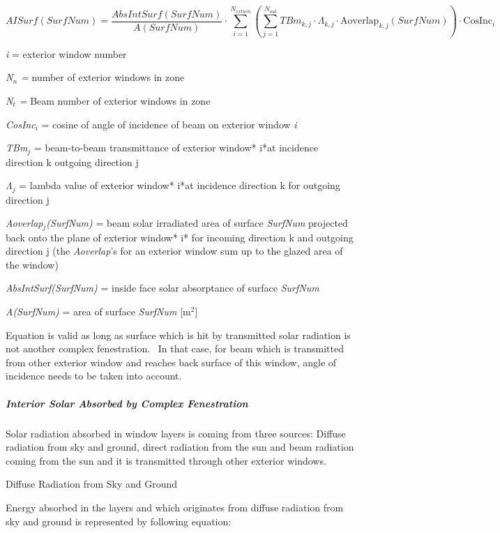 \begin{equation}
AISurf\left(SurfNum\right) = 
    \frac{AbsIntSurf\left(SurfNum\right)}
         {A\left(SurfNum\right)} \cdot
    \sum_{i = 1}^{N_{extwin}} \left( 
       \sum_{j = 1}^{N_{out}} 
          TB{m_{k,j}} \cdot \Lambda_{k,j} \cdot \text{Aoverlap}_{k,j} \left( SurfNum \right)
       \right) \cdot \text{CosInc}_i
\end{equation}

\emph{i} = exterior window number

\emph{N\(_{n}\) =} number of exterior windows in zone

\emph{N\(_{t}\) =} Beam number of exterior windows in zone

\emph{CosInc\(_{i}\)} = cosine of angle of incidence of beam on exterior window \emph{i}

\emph{TBm\(_{j}\)} = beam-to-beam transmittance of exterior window* i*at incidence direction k outgoing direction j

\emph{Λ\(_{j}\)} = lambda value of exterior window* i*at incidence direction k for outgoing direction j

\emph{Aoverlap\(_{j}\)(SurfNum)} = beam solar irradiated area of surface \emph{SurfNum} projected back onto the plane of exterior window* i* for incoming direction k and outgoing direction j (the \emph{Aoverlap}'s for an exterior window sum up to the glazed area of the window)

\emph{AbsIntSurf(SurfNum)} = inside face solar absorptance of surface \emph{SurfNum}

\emph{A(SurfNum)} = area of surface \emph{SurfNum} {[}m\(^{2}\){]}

Equation is valid as long as surface which is hit by transmitted solar radiation is not another complex fenestration.~ In that case, for beam which is transmitted from other exterior window and reaches back surface of this window, angle of incidence needs to be taken into account.

\subparagraph{Interior Solar Absorbed by Complex Fenestration}\label{interior-solar-absorbed-by-complex-fenestration}

Solar radiation absorbed in window layers is coming from three sources: Diffuse radiation from sky and ground, direct radiation from the sun and beam radiation coming from the sun and it is transmitted through other exterior windows.

Diffuse Radiation from Sky and Ground

Energy absorbed in the layers and which originates from diffuse radiation from sky and ground is represented by following equation:

